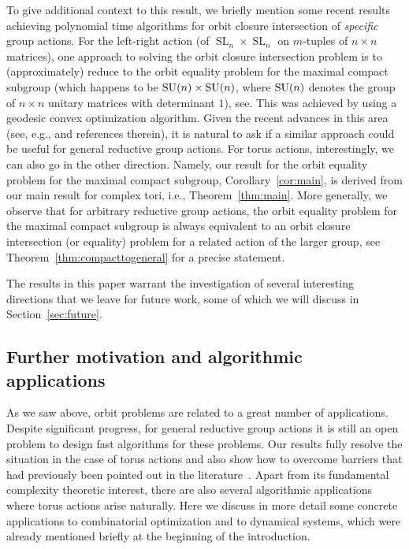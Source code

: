 \documentclass[10pt,a4paper]{article}
\DeclareMathOperator{\SL}{SL}
\theoremstyle{definition}
\numberwithin{equation}{section}
\begin{document}
To give additional context to this result, we briefly mention some recent results achieving polynomial time algorithms for orbit closure intersection of \emph{specific} group actions.
For the left-right action (of $\SL_n \times \SL_n$ on $m$-tuples of $n \times n$ matrices), one approach to solving the orbit closure intersection problem is to (approximately) reduce to the orbit equality problem for the maximal compact subgroup (which happens to be ${\rm SU}(n) \times {\rm SU}(n)$, where ${\rm SU}(n)$ denotes the group of $n \times n$ unitary matrices with determinant $1$), see\cite{AZGLOW}.
This was achieved by using a geodesic convex optimization algorithm.
Given the recent advances in this area (see, e.g., \cite{BFGOWW2} and references therein), it is natural to ask if a similar approach could be useful for general reductive group actions.
For torus actions, interestingly, we can also go in the other direction.
Namely, our result for the orbit equality problem for the maximal compact subgroup, Corollary~\ref{cor:main}, is derived from our main result for complex tori, i.e., Theorem~\ref{thm:main}.
More generally, we observe that for arbitrary reductive group actions, the orbit equality problem for the maximal compact subgroup is always equivalent to an orbit closure intersection (or equality) problem for a related action of the larger group, see Theorem~\ref{thm:compacttogeneral} for a precise statement.

%

The results in this paper warrant the investigation of several interesting directions that we leave for future work, some of which we will discuss in Section~\ref{sec:future}.

%
\subsection{Further motivation and algorithmic applications}\label{subsec:applications}
%
As we saw above, orbit problems are related to a great number of applications.
Despite significant progress, for general reductive group actions it is still an open problem to design fast algorithms for these problems.
Our results fully resolve the situation in the case of torus actions and also show how to overcome barriers that had previously been pointed out in the literature~\cite{ikenmeyer2017vanishing,GIMOWW}.
Apart from its fundamental complexity theoretic interest, there are also several algorithmic applications where torus actions arise naturally.
Here we discuss in more detail some concrete applications to combinatorial optimization and to dynamical systems,
which were already mentioned briefly at the beginning of the introduction.
\end{document}
